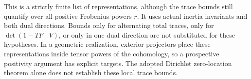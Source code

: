 This is a strictly finite list of representations,
although the trace bounds still quantify over all
positive Frobenius powers $r$. It uses actual
inertia invariants and both dual directions. Bounds
only for alternating total traces, only for
$\det(1-TF\mid V)$, or only in one dual direction
are not substituted for these hypotheses.
In a geometric realization, exterior projectors
place these representations inside tensor powers
of the cohomology, so a prospective positivity
argument has explicit targets. The adopted
Dirichlet zero-location theorem alone does not
establish these local trace bounds.
